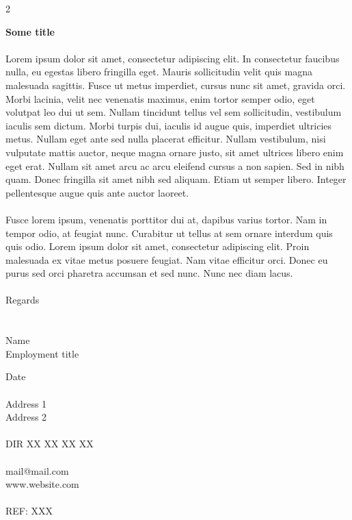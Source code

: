 \documentclass{article}
\begin{document}
\begin{paracol}{2}
    \begin{tcolorbox}[blanker, breakable, width=\linewidth]

    \textbf{Some title}
    \\
    \\
    Lorem ipsum dolor sit amet, consectetur adipiscing elit. In consectetur faucibus nulla, eu egestas libero fringilla eget. Mauris sollicitudin velit quis magna malesuada sagittis. Fusce ut metus imperdiet, cursus nunc sit amet, gravida orci. Morbi lacinia, velit nec venenatis maximus, enim tortor semper odio, eget volutpat leo dui ut sem. Nullam tincidunt tellus vel sem sollicitudin, vestibulum iaculis sem dictum. Morbi turpis dui, iaculis id augue quis, imperdiet ultricies metus. Nullam eget ante sed nulla placerat efficitur. Nullam vestibulum, nisi vulputate mattis auctor, neque magna ornare justo, sit amet ultrices libero enim eget erat. Nullam sit amet arcu ac arcu eleifend cursus a non sapien. Sed in nibh quam. Donec fringilla sit amet nibh sed aliquam. Etiam ut semper libero. Integer pellentesque augue quis ante auctor laoreet.
    \\
    \\
    Fusce lorem ipsum, venenatis porttitor dui at, dapibus varius tortor. Nam in tempor odio, at feugiat nunc. Curabitur ut tellus at sem ornare interdum quis quis odio. Lorem ipsum dolor sit amet, consectetur adipiscing elit. Proin malesuada ex vitae metus posuere feugiat. Nam vitae efficitur orci. Donec eu purus sed orci pharetra accumsan et sed nunc. Nunc nec diam lacus.
    \\
    \\
    Regards
    \\
    \\
    \\
    Name\\
    Employment title
        
    \end{tcolorbox}
    \switchcolumn
    \begin{tcolorbox}[blanker, breakable, width=\linewidth]
    {\fontsize{8}{14}\selectfont

    Date
    \\ \\
    Address 1 \\
    Address 2
    \\ \\
    DIR XX XX XX XX
    \\ \\
    mail@mail.com \\
    www.website.com
    \\ \\
    REF: XXX

    }
    \end{tcolorbox}
\end{paracol}
\end{document}
